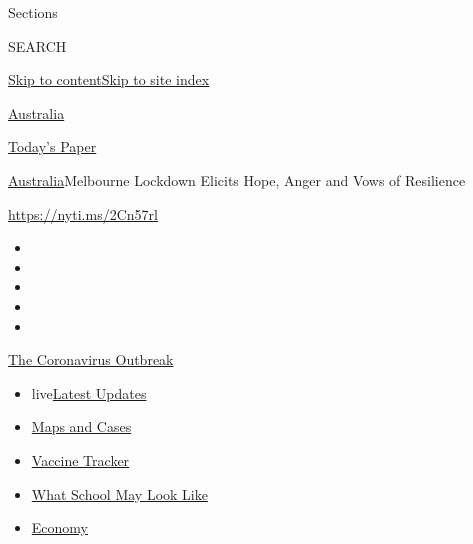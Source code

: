 Sections

SEARCH

\protect\hyperlink{site-content}{Skip to
content}\protect\hyperlink{site-index}{Skip to site index}

\href{https://www.nytimes3xbfgragh.onion/section/world/australia}{Australia}

\href{https://myaccount.nytimes3xbfgragh.onion/auth/login?response_type=cookie\&client_id=vi}{}

\href{https://www.nytimes3xbfgragh.onion/section/todayspaper}{Today's
Paper}

\href{/section/world/australia}{Australia}\textbar{}Melbourne Lockdown
Elicits Hope, Anger and Vows of Resilience

\url{https://nyti.ms/2Cn57rl}

\begin{itemize}
\item
\item
\item
\item
\item
\end{itemize}

\href{https://www.nytimes3xbfgragh.onion/news-event/coronavirus?action=click\&pgtype=Article\&state=default\&region=TOP_BANNER\&context=storylines_menu}{The
Coronavirus Outbreak}

\begin{itemize}
\tightlist
\item
  live\href{https://www.nytimes3xbfgragh.onion/2020/08/01/world/coronavirus-covid-19.html?action=click\&pgtype=Article\&state=default\&region=TOP_BANNER\&context=storylines_menu}{Latest
  Updates}
\item
  \href{https://www.nytimes3xbfgragh.onion/interactive/2020/us/coronavirus-us-cases.html?action=click\&pgtype=Article\&state=default\&region=TOP_BANNER\&context=storylines_menu}{Maps
  and Cases}
\item
  \href{https://www.nytimes3xbfgragh.onion/interactive/2020/science/coronavirus-vaccine-tracker.html?action=click\&pgtype=Article\&state=default\&region=TOP_BANNER\&context=storylines_menu}{Vaccine
  Tracker}
\item
  \href{https://www.nytimes3xbfgragh.onion/interactive/2020/07/29/us/schools-reopening-coronavirus.html?action=click\&pgtype=Article\&state=default\&region=TOP_BANNER\&context=storylines_menu}{What
  School May Look Like}
\item
  \href{https://www.nytimes3xbfgragh.onion/live/2020/07/31/business/stock-market-today-coronavirus?action=click\&pgtype=Article\&state=default\&region=TOP_BANNER\&context=storylines_menu}{Economy}
\end{itemize}

